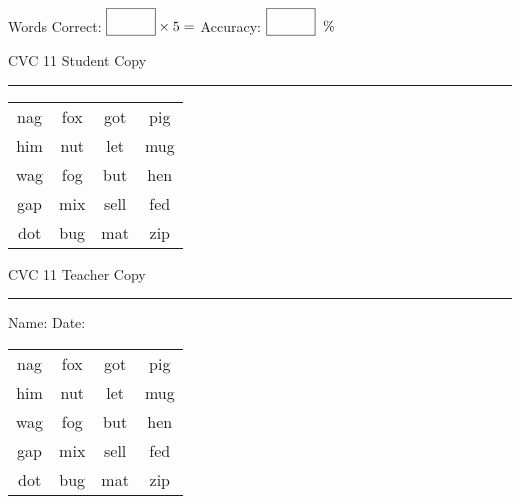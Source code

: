 \documentclass{memoir}
\begin{document}
\small

Words Correct: $\fbox{\phantom{\huge 100}} \times 5 = $ Accuracy: $\fbox{\phantom{\huge 100}}\;\; \%$ 

\vfill

\newpage


\footnotesize \noindent
CVC 11 \hfill Student Copy
\smallskip
\hrule

\Large

\setlength{\tabcolsep}{14pt}
\def\arraystretch{2}

{\selectfont


\begin{vplace}[0.5]
\begin{center}
\begin{tabular}{cccc}
nag & fox & got & pig \\
him & nut & let & mug \\
wag & fog & but & hen \\
gap & mix & sell & fed \\
dot & bug & mat & zip \\
\end{tabular}
\end{center}
\end{vplace}

}

\newpage

\footnotesize \noindent
CVC 11 \hfill Teacher Copy
\smallskip
\hrule

\small

\vfill

\noindent
Name: \underline{\hspace{1.75in}} \hfill Date: \underline{\hspace{1in}}

\Large

{\selectfont


\begin{vplace}[0.5]
\begin{center}
\begin{tabular}{cccc}
nag & fox & got & pig \\
him & nut & let & mug \\
wag & fog & but & hen \\
gap & mix & sell & fed \\
dot & bug & mat & zip \\
\end{tabular}
\end{center}
\end{vplace}



}
\end{document}
